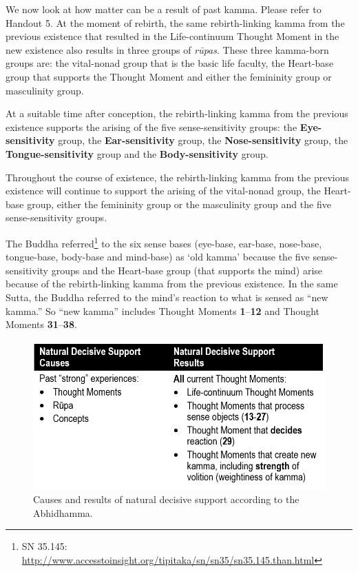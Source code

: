 We now look at how matter can be a result of past kamma. Please refer to Handout 5. At the moment of rebirth, the same rebirth-linking kamma from the previous existence that resulted in the Life-continuum Thought Moment in the new existence also results in three groups of \textit{rūpas}. These three kamma-born groups are: the vital-nonad group that is the basic life faculty, the Heart-base group that supports the Thought Moment and either the femininity group or masculinity group.

At a suitable time after conception, the rebirth-linking kamma from the previous existence supports the arising of the five sense-sensitivity groups: the \textbf{Eye-sensitivity} group, the \textbf{Ear-sensitivity} group, the \textbf{Nose-sensitivity} group, the \textbf{Tongue-sensitivity} group and the \textbf{Body-sensitivity} group.

Throughout the course of existence, the rebirth-linking kamma from the previous existence will continue to support the arising of the vital-nonad group, the Heart-base group, either the femininity group or the masculinity group and the five sense-sensitivity groups.

The Buddha referred\footnote{SN 35.145: \url{http://www.accesstoinsight.org/tipitaka/sn/sn35/sn35.145.than.html}} to the six sense bases (eye-base, ear-base, nose-base, tongue-base, body-base and mind-base) as ‘old kamma’ because the five sense-sensitivity groups and the Heart-base group (that supports the mind) arise because of the rebirth-linking kamma from the previous existence. In the same Sutta, the Buddha referred to the mind’s reaction to what is sensed as ``new kamma.'' So ``new kamma'' includes Thought Moments \textbf{1}--\textbf{12} and Thought Moments \textbf{31}--\textbf{38}.

\begin{figure}[h]
\centering
\includegraphics[width=0.7\linewidth]{./Diagrams/NDS}
\caption{Causes and results of natural decisive support according to the Abhidhamma.}
\label{fig:NDS}
\end{figure}

